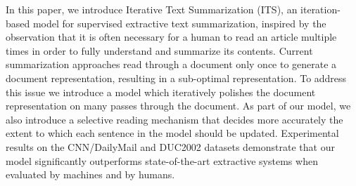 In this paper, we introduce Iterative Text Summarization (ITS), an iteration-based model for supervised extractive text summarization, inspired by the observation that it is often necessary for a human to read an article multiple times in order to fully understand and summarize its contents. Current summarization approaches read through a document only once to generate a document representation, resulting in a sub-optimal representation. To address this issue we introduce a model which iteratively polishes the document representation on many passes through the document. As part of our model, we also introduce a selective reading mechanism that decides more accurately the extent to which each sentence in the model should be updated. Experimental results on the CNN/DailyMail and DUC2002 datasets demonstrate that our model significantly outperforms state-of-the-art extractive systems when evaluated by machines and by humans.
